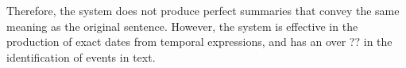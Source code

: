 \par Therefore, the system does not produce perfect summaries that convey the same meaning as the original sentence. However, the system is effective in the production of exact dates from temporal expressions, and has an over ?? in the identification of events in text.



































